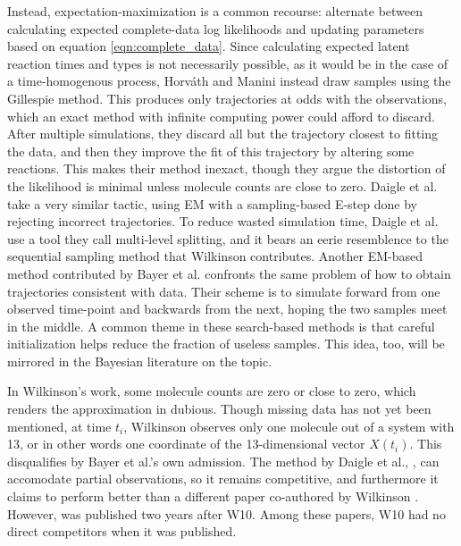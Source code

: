 \documentclass{article}
\begin{document}
 Instead, expectation-maximization is a common recourse: alternate between calculating expected complete-data log likelihoods and updating parameters based on equation \ref{eqn:complete_data}. Since calculating expected latent reaction times and types is not necessarily possible, as it would be in the case of a time-homogenous process, Horv\'ath and Manini \cite{horvath2008parameter} instead draw samples using the Gillespie method. This produces only trajectories at odds with the observations, which an exact method with infinite computing power could afford to discard. After multiple simulations, they discard all but the trajectory closest to fitting the data, and then they improve the fit of this trajectory by altering some reactions. This makes their method inexact, though they argue the distortion of the likelihood is minimal unless molecule counts are close to zero. Daigle et al. \cite{daigle2012accelerated} take a very similar tactic, using EM with a sampling-based E-step done by rejecting incorrect trajectories. To reduce wasted simulation time, Daigle et al. use a tool they call multi-level splitting, and it bears an eerie resemblence to the sequential sampling method that Wilkinson contributes. Another EM-based method contributed by Bayer et al. \cite{bayer2015stoch_em} confronts the same problem of how to obtain trajectories consistent with data. Their scheme is to simulate forward from one observed time-point and backwards from the next, hoping the two samples meet in the middle. A common theme in these search-based methods is that careful initialization helps reduce the fraction of useless samples. This idea, too, will be mirrored in the Bayesian literature on the topic.

In Wilkinson's work, some molecule counts are zero or close to zero, which renders the approximation in \cite{horvath2008parameter} dubious. Though missing data has not yet been mentioned, at time $t_i$, Wilkinson observes only one molecule out of a system with 13, or in other words one coordinate of the 13-dimensional vector $X(t_i)$. This disqualifies \cite{bayer2015stoch_em} by Bayer et al.'s own admission. The method by Daigle et al., \cite{daigle2012accelerated}, can accomodate partial observations, so it remains competitive, and furthermore it claims to perform better than a different paper co-authored by Wilkinson \cite{Boys2008}. However, \cite{daigle2012accelerated} was published two years after W10. Among these papers, W10 had no direct competitors when it was published.
\end{document}
